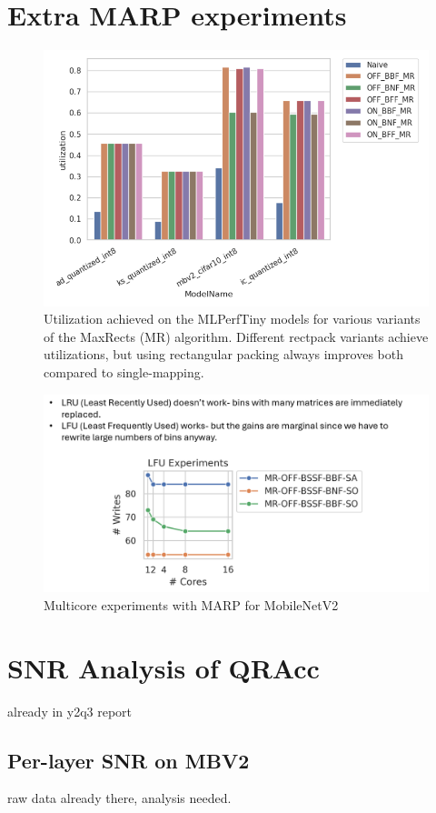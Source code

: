 \section{Extra MARP experiments}
\label{section:extra_marp_experiments}

\begin{figure}[htbp]
    \centering
    \includegraphics[width=\textwidth]{images/appendix/mlperftiny_utilization_vs_packer.png}
    \caption{Utilization achieved on the MLPerfTiny models for various variants of the MaxRects (MR) algorithm. Different rectpack variants achieve utilizations, but using rectangular packing always improves both compared to single-mapping.}
\end{figure}

\begin{figure}[htbp]
    \centering
    \includegraphics[width=\textwidth]{images/appendix/marp_multicore.png}
    \caption{Multicore experiments with MARP for MobileNetV2}
\end{figure}


\section{SNR Analysis of QRAcc}
\label{section:snr_analysis}

already in y2q3 report

\subsection{Per-layer SNR on MBV2}

raw data already there, analysis needed.